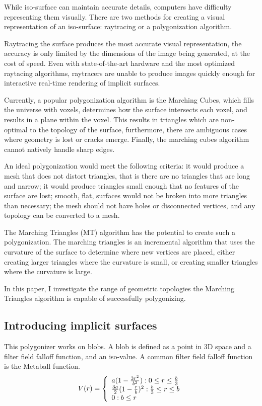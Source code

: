 \documentclass[conference]{acmsiggraph}
\begin{document}
While iso-surface can maintain accurate details, computers have difficulty
representing them visually. There are two methods for creating a visual
representation of an iso-surface: raytracing or a polygonization algorithm.

Raytracing the surface produces the most accurate visual representation, the
accuracy is only limited by the dimensions of the image being generated, at the
cost of speed. Even with state-of-the-art hardware and the most optimized
raytacing algorithms, raytracers are unable to produce images quickly enough
for interactive real-time rendering of implicit surfaces.

Currently, a popular polygonization algorithm is the Marching Cubes, which
fills the universe with voxels, determines how the surface intersects each
voxel, and results in a plane within the voxel. This results in triangles which
are non-optimal to the topology of the surface, furthermore, there are
ambiguous cases where geometry is lost or cracks emerge. Finally, the marching
cubes algorithm cannot natively handle sharp edges.

An ideal polygonization would meet the following criteria:
it would produce a mesh that does not distort triangles, that is there are no
triangles that are long and narrow; it would produce triangles small enough
that no features of the surface are lost; smooth, flat, surfaces would not be
broken into more triangles than necessary; the mesh should not have holes or
disconnected vertices, and any topology can be converted to a mesh.

The Marching Triangles (MT) algorithm has the potential to create such a
polygonization. The marching triangles is an incremental algorithm that uses
the curvature of the surface to determine where new vertices are placed, either
creating larger triangles where the curvature is small, or creating smaller
triangles where the curvature is large.

In this paper, I investigate the range of geometric topologies the Marching
Triangles algorithm is capable of successfully polygonizing.

\subsection{Introducing implicit surfaces}
This polygonizer works on blobs. A blob is defined as a point in 3D space and a
filter field falloff function, and an iso-value. A common filter field falloff
function is the Metaball function.
\begin{displaymath}
	V(r) = \left\{
		\begin{array}{lr}
			a(1 - {{3r^2}\over{b^2}}) : 0 \le r \le {b\over 3}\\
			{3a\over2}(1 - {r\over b})^2 : {b\over 3} \le r \le b\\
			0 : b \le r
		\end{array}
	\right.
\end{displaymath}
\end{document}
